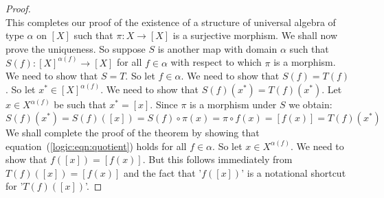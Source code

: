 \begin{proof}
\[    \]
This completes our proof of the existence of a structure of
universal algebra of type $\alpha$ on $[X]$ such that $\pi:X\to[X]$
is a surjective morphism. We shall now prove the uniqueness. So
suppose $S$ is another map with domain $\alpha$ such that
$S(f):[X]^{\alpha(f)}\to[X]$ for all $f\in\alpha$ with respect to
which $\pi$ is a morphism. We need to show that $S=T$. So let
$f\in\alpha$. We need to show that $S(f)=T(f)$. So let
$x^{*}\in[X]^{\alpha(f)}$. We need to show that
$S(f)(x^{*})=T(f)(x^{*})$. Let $x\in X^{\alpha(f)}$ be such that
$x^{*}=[x]$. Since $\pi$ is a morphism under $S$ we obtain:
    \[
    S(f)(x^{*})=S(f)([x])=S(f)\circ\pi(x)=\pi\circ f(x)=[f(x)]=T(f)(x^{*})
    \]
We shall complete the proof of the theorem by showing that
equation~(\ref{logic:eqn:quotient}) holds for all $f\in\alpha$. So
let $x\in X^{\alpha(f)}$. We need to show that $f([x])=[f(x)]$. But
this follows immediately from $T(f)([x])=[f(x)]$ and the fact that
'$f([x])$' is a notational shortcut for '$T(f)([x])$'.
\end{proof}
